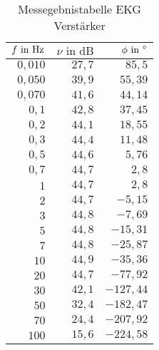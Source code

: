 \begin{table}[]
\centering
\caption{Messegebnistabelle EKG Verstärker}
\label{tab:ergTable_ekg}
\begin{tabular}{|r|r|r|}
\hline
\rowcolor[HTML]{C0C0C0} 
$f\text{ in }\text{Hz}     $&$ \nu \text{ in dB}    $&$ \phi \text{ in } ^\circ    $\\ \hline
$0,010 $&$ 27,7 $&$ 85,5    $\\ \hline
$0,050 $&$ 39,9 $&$ 55,39   $\\ \hline
$0,070 $&$ 41,6 $&$ 44,14   $\\ \hline
$0,1   $&$ 42,8 $&$ 37,45   $\\ \hline
$0,2   $&$ 44,1 $&$ 18,55   $\\ \hline
$0,3   $&$ 44,4 $&$ 11,48   $\\ \hline
$0,5   $&$ 44,6 $&$ 5,76    $\\ \hline
$0,7   $&$ 44,7 $&$ 2,8     $\\ \hline
$1     $&$ 44,7 $&$ 2,8     $\\ \hline
$2     $&$ 44,7 $&$ -5,15   $\\ \hline
$3     $&$ 44,8 $&$ -7,69   $\\ \hline
$5     $&$ 44,8 $&$ -15,31  $\\ \hline
$7     $&$ 44,8 $&$ -25,87  $\\ \hline
$10    $&$ 44,9 $&$ -35,36  $\\ \hline
$20    $&$ 44,7 $&$ -77,92  $\\ \hline
$30    $&$ 42,1 $&$ -127,44 $\\ \hline
$50    $&$ 32,4 $&$ -182,47 $\\ \hline
$70    $&$ 24,4 $&$ -207,92 $\\ \hline
$100   $&$ 15,6 $&$ -224,58 $\\ \hline
\end{tabular}
\end{table}